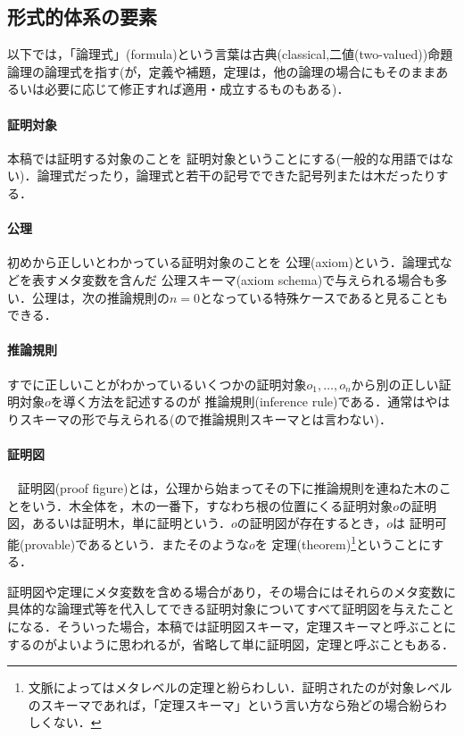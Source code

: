 \documentclass{ltjsarticle}
\theoremstyle{mystyle1}
\theoremstyle{mystyle2}
\newcommand{\red}[1]{{\color{red} #1}}
\begin{document}
\subsection{形式的体系の要素}
以下では，「論理式」(formula)という言葉は古典(classical,二値(two-valued))命題論理の論理式を指す(が，定義や補題，定理は，他の論理の場合にもそのままあるいは必要に応じて修正すれば適用・成立するものもある)．
\paragraph{証明対象}
本稿では証明する対象のことを\red{証明対象}ということにする(一般的な用語ではない)．論理式だったり，論理式と若干の記号でできた記号列または木だったりする．
\paragraph{公理}
初めから正しいとわかっている証明対象のことを\red{公理}(axiom)という．論理式などを表すメタ変数を含んだ\red{公理スキーマ}(axiom schema)で与えられる場合も多い．公理は，次の推論規則の$n =0$となっている特殊ケースであると見ることもできる．
\paragraph{推論規則}
すでに正しいことがわかっているいくつかの証明対象$o_1,\ldots,o_n$から別の正しい証明対象$o$を導く方法を記述するのが\red{推論規則}(inference rule)である．通常はやはりスキーマの形で与えられる(ので推論規則スキーマとは言わない)．
\begin{prooftree}
\end{prooftree}

\paragraph{証明図}
\ \red{証明図}(proof figure)とは，公理から始まってその下に推論規則を連ねた木のことをいう．木全体を，木の一番下，すなわち根の位置にくる証明対象$o$の証明図，あるいは証明木，単に証明という．$o$の証明図が存在するとき，$o$は\red{証明可能}(provable)であるという．またそのような$o$を\red{定理}(theorem)\footnote{文脈によってはメタレベルの定理と紛らわしい．証明されたのが対象レベルのスキーマであれば，「定理スキーマ」という言い方なら殆どの場合紛らわしくない．}ということにする．

証明図や定理にメタ変数を含める場合があり，その場合にはそれらのメタ変数に具体的な論理式等を代入してできる証明対象についてすべて証明図を与えたことになる．そういった場合，本稿では証明図スキーマ，定理スキーマと呼ぶことにするのがよいように思われるが，省略して単に証明図，定理と呼ぶこともある．
\end{document}
